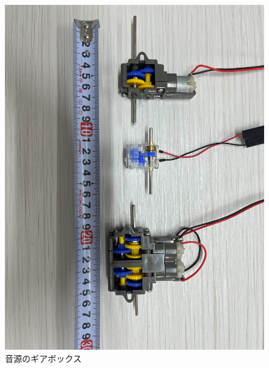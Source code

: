 \documentclass[../main]{subfiles}
\begin{document}
\begin{figure}[t]
  \centering
  \includegraphics[keepaspectratio, width=1.0\linewidth]{chap4/gearbox.jpg}
  \caption{音源のギアボックス}
  \label{fig:gearbox}
\end{figure}
\end{document}
